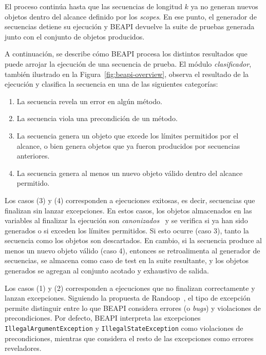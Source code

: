El proceso continúa hasta que las secuencias de longitud $k$ ya no generan nuevos objetos dentro del alcance definido por los \emph{scopes}. 
En ese punto, el generador de secuencias detiene su ejecución y BEAPI devuelve la suite de pruebas generada junto con el conjunto de objetos producidos.

A continuación, se describe cómo BEAPI procesa los distintos resultados que puede arrojar la ejecución de una secuencia de prueba.
El módulo \emph{clasificador}, también ilustrado en la Figura~\ref{fig:beapi-overview}, 
observa el resultado de la ejecución y clasifica la secuencia en una de las siguientes categorías:

\begin{enumerate}
    \item La secuencia revela un error en algún método.
    \item La secuencia viola una precondición de un método.
    \item La secuencia genera un objeto que excede los límites permitidos por el alcance, o bien genera objetos que ya fueron producidos por secuencias anteriores.
    \item La secuencia genera al menos un nuevo objeto válido dentro del alcance permitido.
\end{enumerate}

Los casos (3) y (4) corresponden a ejecuciones exitosas, es decir, secuencias que finalizan sin lanzar excepciones. 
En estos casos, los objetos almacenados en las variables al finalizar la ejecución son \emph{canonizados}~\cite{Politano20} 
y se verifica si ya han sido generados o si exceden los límites permitidos. 
Si esto ocurre (caso 3), tanto la secuencia como los objetos son descartados. 
En cambio, si la secuencia produce al menos un nuevo objeto válido (caso 4), 
entonces se retroalimenta al generador de secuencias, 
se almacena como caso de test en la suite resultante,
y los objetos generados se agregan al conjunto acotado y exhaustivo de salida.

Los casos (1) y (2) corresponden a ejecuciones que no finalizan correctamente y lanzan excepciones. 
Siguiendo la propuesta de Randoop~\cite{Pacheco07}, el tipo de excepción permite distinguir entre lo que BEAPI considera errores (o \emph{bugs}) 
y violaciones de precondiciones. 
Por defecto, BEAPI interpreta las excepciones \texttt{IllegalArgumentException} y \texttt{IllegalStateException} 
como violaciones de precondiciones, mientras que considera el resto de las excepciones como errores reveladores.

